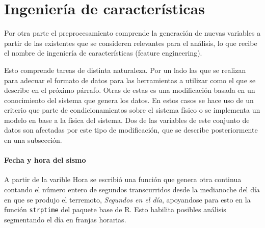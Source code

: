 \documentclass[a4paper]{report}
\begin{document}




\section{Ingeniería de características}\label{sec:ingeniería}

Por otra parte el preprocesamiento comprende la generación de nuevas variables a partir de las existentes que se consideren relevantes para el análisis, lo que recibe el nombre de ingeniería de características (feature engineering).

Esto comprende tareas de distinta naturaleza.
Por un lado las que se realizan para adecuar el formato de datos para las herramientas a utilizar como el que se describe en el próximo párrafo.
Otras de estas es una modificación basada en un conocimiento del sistema que genera los datos.
En estos casos se hace uso de un criterio que parte de condicionamientos sobre el sistema físico o se implementa un modelo en base a la física del sistema.
Dos de las variables de este conjunto de datos son afectadas por este tipo de modificación, que se describe posteriormente en una subsección.



\paragraph{Fecha y hora del sismo}
A partir de la varible Hora se escribió una función que genera otra continua contando el número entero de segundos transcurridos desde la medianoche del día en que se produjo el terremoto, \emph{Segundos en el día}, apoyandose para esto en la función \verb'strptime' del paquete base de R.
Esto habilita posibles análisis segmentando el día en franjas horarias.
\end{document}
